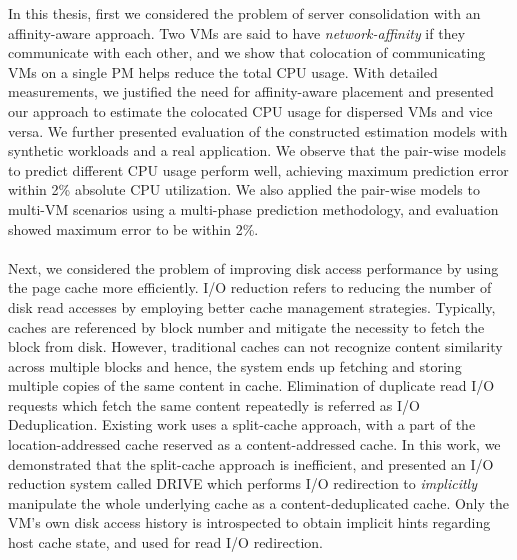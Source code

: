 In this thesis, first we considered the problem of 
server consolidation with an affinity-aware approach. Two VMs are 
said to have \textit{network-affinity} if they 
communicate with each other, and we show that colocation
of communicating VMs on a single PM helps reduce the total CPU usage.
With detailed measurements, we justified the need for
affinity-aware placement and presented our approach to estimate
the colocated CPU usage for dispersed VMs and vice versa. We 
further presented evaluation
of the constructed estimation models with synthetic workloads
and a real application. We observe that the pair-wise models
to predict different CPU usage 
perform well, achieving maximum prediction
error within 2\% absolute CPU utilization. We also applied
the pair-wise models to multi-VM scenarios using a multi-phase
prediction methodology, and evaluation showed maximum
error to be within 2\%.
\\
\\
Next, we considered the problem of improving disk access performance
by using the page cache more efficiently. 
I/O reduction refers to reducing the number of disk read accesses by
employing better cache management strategies. Typically, caches are
referenced by block number and mitigate the necessity to fetch the block
from disk. However, traditional caches can not recognize content similarity
across multiple blocks and hence, the system ends up fetching and storing
multiple copies of the same content in cache.
Elimination of duplicate read I/O requests which fetch the same
content repeatedly is referred as I/O Deduplication.
Existing work uses a split-cache approach, with a part of the location-addressed
cache reserved as a content-addressed cache. In this work, we demonstrated
that the split-cache approach is inefficient, and presented an
I/O reduction system called DRIVE which performs I/O
redirection to \textit{implicitly} manipulate the whole underlying cache as
a content-deduplicated cache. Only the VM's own disk access history is
introspected to obtain implicit hints regarding host cache state, and used
for read I/O redirection.

